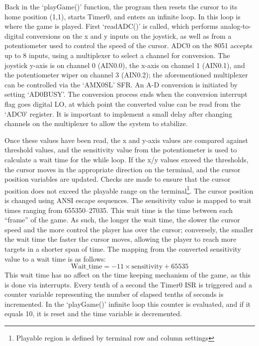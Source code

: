 \documentclass[12pt]{article}
\begin{document}
Back in the `playGame()' function, the program then resets the cursor to its home position (1,1), starts Timer0, and enters an infinite loop. In this loop is where the game is played. First `readADC()' is called, which performs analog-to-digital conversions on the x and y inputs on the joystick, as well as from a potentiometer used to control the speed of the cursor. ADC0 on the 8051 accepts up to 8 inputs, using a multiplexer to select a channel for conversion. The joystick y-axis is on channel 0 (AIN0.0), the x-axis on channel 1 (AIN0.1), and the potentiometer wiper on channel 3 (AIN0.2); the aforementioned multiplexer can be controlled via the `AMX0SL' SFR. An A-D conversion is initiated by setting `AD0BUSY'. The conversion process ends when the conversion interrupt flag goes digital LO, at which point the converted value can be read from the `ADC0' register. It is important to implement a small delay after changing channels on the multiplexer to allow the system to stabilize. 

Once these values have been read, the x and y-axis values are compared against threshold values, and the sensitivity value from the potentiometer is used to calculate a wait time for the while loop. If the x/y values exceed the thresholds, the cursor moves in the appropriate direction on the terminal, and the cursor position variables are updated. Checks are made to ensure that the cursor position does not exceed the playable range on the terminal\footnote{Playable region is defined by terminal row and column settings}. The cursor position is changed using ANSI escape sequences. The sensitivity value is mapped to wait times ranging from 655350--27035. This wait time is the time between each ``frame'' of the game. As such, the longer the wait time, the slower the cursor speed and the more control the player has over the cursor; conversely, the smaller the wait time the faster the cursor moves, allowing the player to reach more targets in a shorter span of time. The mapping from the converted sensitivity value to a wait time is as follows: 
\begin{displaymath}
	\mathrm{Wait\_time}=-11\times \mathrm{sensitivity}+65535
\end{displaymath}
This wait time has no affect on the time keeping mechanism of the game, as this is done via interrupts. Every tenth of a second the Timer0 ISR is triggered and a counter variable representing the number of elapsed tenths of seconds is incremented. In the `playGame()' infinite loop this counter is evaluated, and if it equals 10, it is reset and the time variable is decremented. 
\end{document}
